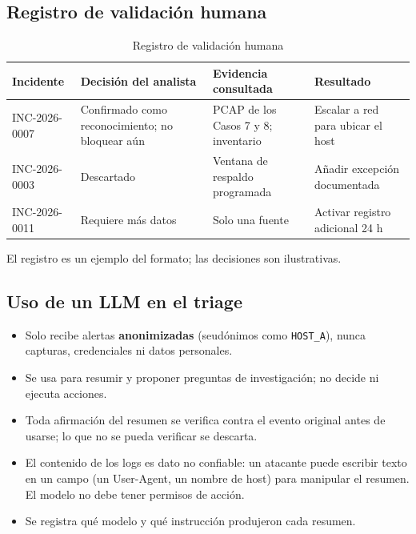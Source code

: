 \subsection{Registro de validación humana}

\begin{table}[H]
\centering
\small
\caption[Registro de validación humana (tabla 1)]{Registro de validación humana}
\begin{tabularx}{\linewidth}{>{\raggedright\arraybackslash}X >{\raggedright\arraybackslash}X >{\raggedright\arraybackslash}X >{\raggedright\arraybackslash}X}
\toprule
\textbf{Incidente} & \textbf{Decisión del analista} & \textbf{Evidencia consultada} & \textbf{Resultado} \\
\midrule
INC-2026-0007 & Confirmado como reconocimiento; no bloquear aún & PCAP de los Casos 7 y 8; inventario & Escalar a red para ubicar el host \\
INC-2026-0003 & Descartado & Ventana de respaldo programada & Añadir excepción documentada \\
INC-2026-0011 & Requiere más datos & Solo una fuente & Activar registro adicional 24 h \\
\bottomrule
\end{tabularx}
\end{table}

El registro es un ejemplo del formato; las decisiones son ilustrativas.

\subsection{Uso de un LLM en el triage}

\begin{itemize}
  \item Solo recibe alertas \textbf{anonimizadas} (seudónimos como \texttt{HOST\_A}), nunca capturas, credenciales ni datos personales.
  \item Se usa para resumir y proponer preguntas de investigación; no decide ni ejecuta acciones.
  \item Toda afirmación del resumen se verifica contra el evento original antes de usarse; lo que no se pueda verificar se descarta.
  \item El contenido de los logs es dato no confiable: un atacante puede escribir texto en un campo (un User-Agent, un nombre de host) para manipular el resumen. El modelo no debe tener permisos de acción.
  \item Se registra qué modelo y qué instrucción produjeron cada resumen.
\end{itemize}


